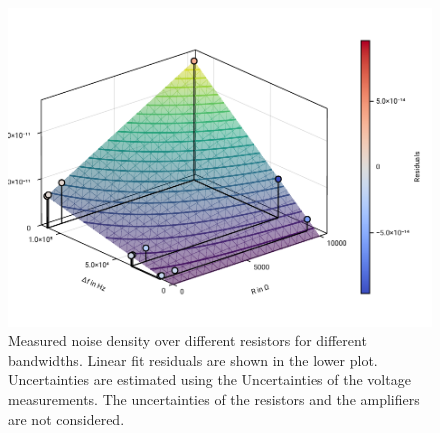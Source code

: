 \documentclass[
    parskip=half, 
    twoside=false,
    twocolumn=true,
    fontsize=11pt,
]{scrarticle}
\begin{document}
\begin{figure}[h!]
    \centering
    \includegraphics{figures/05 johnson noise rt plane.pdf}
    \caption{
        Measured noise density over different resistors for different bandwidths.
        Linear fit residuals are shown in the lower plot.
        Uncertainties are estimated using the Uncertainties of the voltage measurements.
        The uncertainties of the resistors and the amplifiers are not considered.
    }
    \label{fig:johnson noise}
\end{figure}
\end{document}
